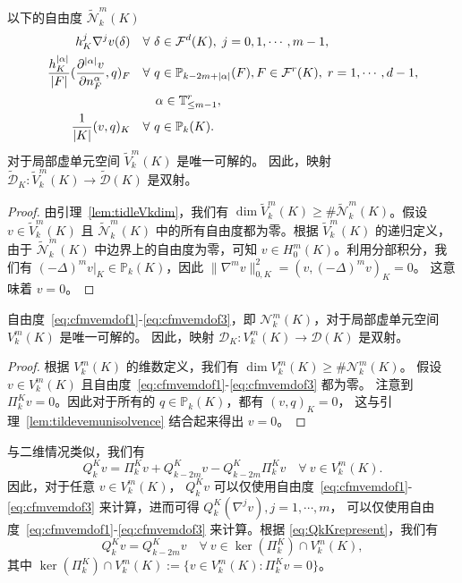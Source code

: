 \begin{lemma}\label{lem:tildevemunisolvence}
以下的自由度 $\widetilde{\mathcal N}_k^m(K)$
\begin{align*}
h_K^j\nabla^{j}v(\delta) & \quad\forall~\delta\in\mathcal F^{d}(K), \;j=0,1,\cdots,m-1, \\
\frac{h_K^{|\alpha|}}{|F|}(\frac{\partial^{|\alpha|}v}{\partial n_F^{\alpha}}, q)_F & \quad\forall~q\in\mathbb P_{k-2m+|\alpha|}(F), F\in\mathcal F^{r}(K), \;r=1,\cdots,d-1, \\
&\quad \quad \alpha\in \mathbb{T}^r_{\leq m-1}, \\
\frac{1}{|K|}(v, q)_K & \quad\forall~q\in\mathbb P_{k}(K).
\end{align*}
对于局部虚单元空间 $\widetilde{V}_k^m(K)$ 是唯一可解的。
因此，映射 $\widetilde{\mathcal D}_K: \widetilde{V}_k^m(K)\to\widetilde{\mathcal D}(K)$ 是双射。
\end{lemma}
\begin{proof}
由引理~\ref{lem:tidleVkdim}，我们有 $\dim\widetilde{V}_k^m(K)\geq\#\widetilde{\mathcal N}_k^m(K)$。假设 $v\in\widetilde{V}_k^m(K)$ 且 $\widetilde{\mathcal N}_k^m(K)$ 中的所有自由度都为零。根据 $\widetilde{V}_k^m(K)$ 的递归定义，由于 $\widetilde{\mathcal N}_k^m(K)$ 中边界上的自由度为零，可知 $v\in H_0^m(K)$。利用分部积分，我们有 $(-\Delta)^mv|_K\in\mathbb P_k(K)$，因此
$
\|\nabla^mv\|_{0,K}^2=(v, (-\Delta)^mv)_K=0。
$
这意味着 $v=0$。

\end{proof}

\begin{lemma}
自由度~\eqref{eq:cfmvemdof1}-\eqref{eq:cfmvemdof3}，即 $\mathcal N_k^m(K)$，对于局部虚单元空间 $V_k^m(K)$ 是唯一可解的。
因此，映射 $\mathcal D_K: V_k^m(K)\to\mathcal D(K)$ 是双射。
\end{lemma}
\begin{proof}
根据 $V_k^m(K)$ 的维数定义，我们有 $\dim V_k^m(K)\geq \#\mathcal N_k^m(K)$。
假设 $v\in V_k^m(K)$ 且自由度~\eqref{eq:cfmvemdof1}-\eqref{eq:cfmvemdof3} 都为零。
注意到 $\Pi_k^Kv=0$。因此对于所有的 $q\in\mathbb P_k(K)$，都有
$
(v, q)_K=0，
$
这与引理~\ref{lem:tildevemunisolvence} 结合起来得出 $v=0$。
\end{proof}

与二维情况类似，我们有
\begin{equation}\label{eq:QkKrepresent}
    Q_k^Kv= \Pi_k^Kv + Q_{k-2m}^Kv-Q_{k-2m}^K\Pi_k^Kv\quad\forall~v\in V_k^m(K).
\end{equation}
因此，对于任意 $v\in V_k^m(K)$，
$Q_k^Kv$ 可以仅使用自由度~\eqref{eq:cfmvemdof1}-\eqref{eq:cfmvemdof3}
来计算，进而可得 $Q_{k}^K(\nabla^jv), j=1, \cdots, m$， 
可以仅使用自由度~\eqref{eq:cfmvemdof1}-\eqref{eq:cfmvemdof3} 来计算。根据
\eqref{eq:QkKrepresent}，我们有
\begin{equation}\label{eq:QkKrepresentkerpi}
    Q_k^Kv= Q_{k-2m}^Kv\quad\forall~v\in \ker(\Pi_k^K)\cap V_k^m(K),
\end{equation}
其中 $\ker(\Pi_k^K)\cap V_{k}^{m}(K):=\{v\in V_{k}^{m}(K): \Pi_k^Kv=0\}$。

